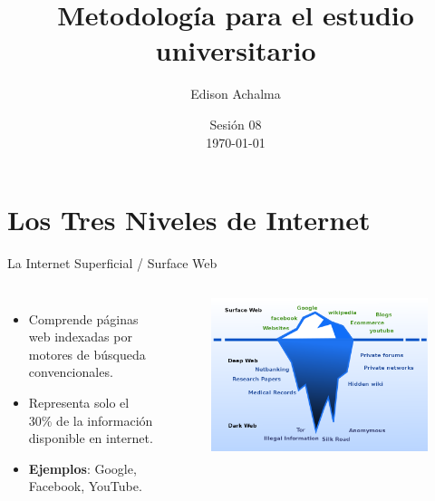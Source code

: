 \documentclass[
11pt, %
]{beamer}
\title[Metodología de Investigación]{Metodología para el estudio universitario} %
\author[Edison Achalma]{Edison Achalma} %
\institute[CAU - UNSCH]{Corporación Académica Universitaria CAU - UNSCH \\ \smallskip \textit{achalmed.18@gmail.com}} %
\date[\today]{Sesión 08 \\ \today} %
\begin{document}
\begin{frame}
	\titlepage
\end{frame}



\section{Los Tres Niveles de Internet}

\begin{frame}{La Internet Superficial / Surface Web}

	\begin{columns}
		\begin{itemize}
			\item Comprende páginas web indexadas por motores de búsqueda convencionales.
			\item Representa solo el 30\% de la información disponible en internet.
			\item \textbf{Ejemplos}: Google, Facebook, YouTube.
		\end{itemize}
		\begin{figure}[H]
			\centering
			\includegraphics[width=1\linewidth]{images/image03}
		\end{figure}
	\end{columns}

\end{frame}
\end{document}
